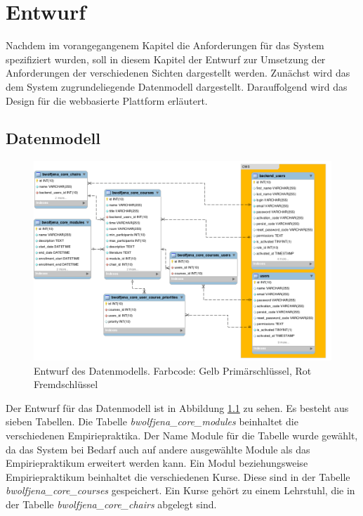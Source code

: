 
\chapter{Entwurf}
\label{chapter:design}
    Nachdem im vorangegangenem Kapitel die Anforderungen für das System spezifiziert wurden, soll in diesem Kapitel der Entwurf zur Umsetzung der Anforderungen der verschiedenen Sichten dargestellt werden.
    Zunächst wird das dem System zugrundeliegende Datenmodell dargestellt.
    Darauffolgend wird das Design für die webbasierte Plattform erläutert.     
    \section{Datenmodell}
        \begin{figure}
            \centering
            \includegraphics[width=1.0\textwidth]{./design/images/data-model.png}\par\vspace{1cm}
            \caption{Entwurf des Datenmodells. Farbcode: Gelb Primärschlüssel, Rot Fremdschlüssel }
            \label{fig:datamodel}
        \end{figure}
        Der Entwurf für das Datenmodell ist in Abbildung \ref{fig:datamodel} zu sehen.
        Es besteht aus sieben Tabellen.
        Die Tabelle \textit{bwolfjena\_core\_modules} beinhaltet die verschiedenen Empiriepraktika.
        Der Name Module für die Tabelle wurde gewählt, da das System bei Bedarf auch auf andere ausgewählte Module als das Empiriepraktikum erweitert werden kann.
        Ein Modul beziehungsweise Empiriepraktikum beinhaltet die verschiedenen Kurse.
        Diese sind in der Tabelle \textit{bwolfjena\_core\_courses} gespeichert.
        Ein Kurse gehört zu einem Lehrstuhl, die in der Tabelle \textit{bwolfjena\_core\_chairs} abgelegt sind.
        
